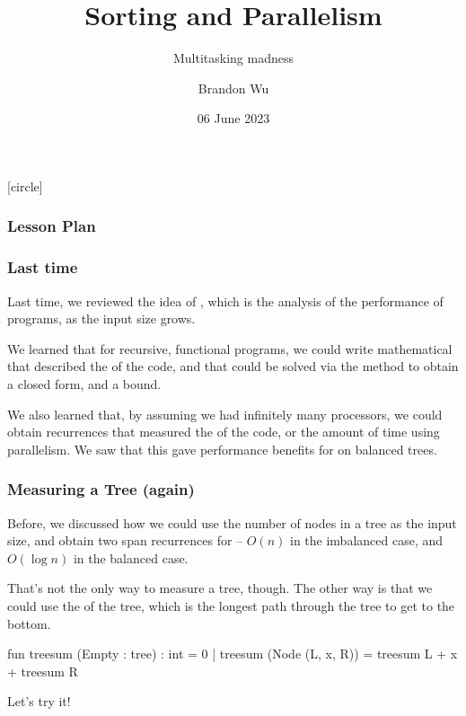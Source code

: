 \documentclass[aspectratio=169, handout]{beamer}
\title{Sorting and Parallelism} %
\subtitle{Multitasking madness} %
\date{06 June 2023} %
\author{Brandon Wu} %
\newif\ifcolorlambda
\begin{document}
\ifweb
    \renewcommand{\pause}{}
\fi

[circle]

{
\begin{frame}[plain]
    \colorlambdatrue
    \titlepage
\end{frame}
}

\begin{frame}[fragile]
  \frametitle{Lesson Plan}

  \tableofcontents
\end{frame}

\begin{frame}[fragile]
  \frametitle{Last time}

  Last time, we reviewed the idea of , which is the analysis
  of the performance of programs, as the input size grows.

  \pause
  \vspace{\fill}

  We learned that for recursive, functional programs, we could write mathematical
   that described the  of the code, and that could be solved
  via the  method to obtain a closed form, and a bound.

  \pause
  \vspace{\fill}

  We also learned that, by assuming we had infinitely many processors, we could
  obtain recurrences that measured the  of the code, or the amount of time
  using parallelism. We saw that this gave performance benefits for  on 
  balanced trees. 
\end{frame}


\begin{frame}[fragile]
  \frametitle{Measuring a Tree (again)} 

  Before, we discussed how we could use the number of nodes in a tree as the input
  size, and obtain two span recurrences for  -- $O(n)$ in the imbalanced
  case, and $O(\log n)$ in the balanced case.

  \pause
  \vspace{\fill}

  That's not the only way to measure a tree, though\footnotemark. The other way is that we could
  use the  of the tree, which is the longest path through the tree to
  get to the bottom.

  \pause
  \vspace{\fill}

  \begin{codeblock}
    fun treesum (Empty : tree) : int = 0
      | treesum (Node (L, x, R)) = treesum L + x + treesum R
  \end{codeblock}

  \vspace{\fill}

  Let's try it!

\end{frame}
\end{document}
